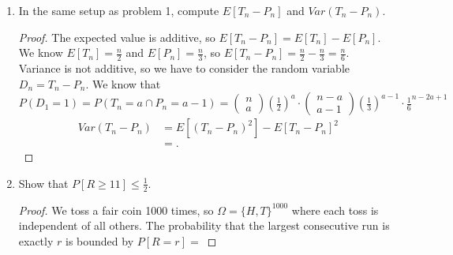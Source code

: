 \documentclass[a4paper]{article}
\begin{document}
\begin{enumerate}
\begin{proof}{Proof by contradiction}
       For example, consider the $P(T_n = n)$ i.e. when all the items chosen after $n$ weeks are tops,  $P(T_n=n) = 
       \text{ no. ways} \cdot \text{ probability} = 1 \cdot \frac{1}{2}^n$. Then $P(T_n = n \cap P_n = b \cap S_n = c) = 0$
       when $b,c > 0$. However, suppose $b,c=1$,  $ P(T_n=n) \cdot P(P_n=1) \cdot P(S_n=1) = \frac{1}{2}^n \cdot 
       \begin{pmatrix} n\\1 \end{pmatrix} \frac{1}{3}\frac{1}{3}^{n-1} \cdot \begin{pmatrix} n \\ 1 \end{pmatrix} \frac{1}{6} \frac{5}{6}^{n-1} 
       \neq 0$! Thus, the three random variables are not independent!
    \end{proof}
  \item In the same setup as problem 1, compute $E[T_n - P_n]$ and  $Var(T_n - P_n)$.
    \begin{proof}
      The expected value is additive, so $E[T_n - P_n] = E[T_n] - E[P_n]$. We know  $E[T_n] = \frac{n}{2}$ and
      $E[P_n] = \frac{n}{3}$, so $E[T_n - P_n] = \frac{n}{2} - \frac{n}{3} = \frac{n}{6}$. \\

      Variance is not additive, so we have to consider the random variable $D_n = T_n - P_n$. We know that 
      $P(D_1 = 1) = P(T_n = a \cap P_n = a -1) = \begin{pmatrix} n \\ a \end{pmatrix}\left( \frac{1}{2} \right)^{a} \cdot 
      \begin{pmatrix} n-a \\ a-1 \end{pmatrix} \left( \frac{1}{3} \right)^{a-1} \cdot \frac{1}{6}^{n-2a+1}$
       \begin{align*}
         Var(T_n - P_n) &= E[(T_n - P_n)^2] - E[T_n - P_n]^2 \\
                        &=
      .\end{align*}
    \end{proof}
  \item Show that $P[R \geq 11] \leq \frac{1}{2}$.
    \begin{proof}
      We toss a fair coin 1000 times, so $\Omega = \{H,T\}^{1000}$ where each toss is independent of all others. 
      The probability that the largest consecutive run is exactly $r$ is bounded by $P[R=r] = $



\end{proof}
\end{enumerate}
\end{document}
